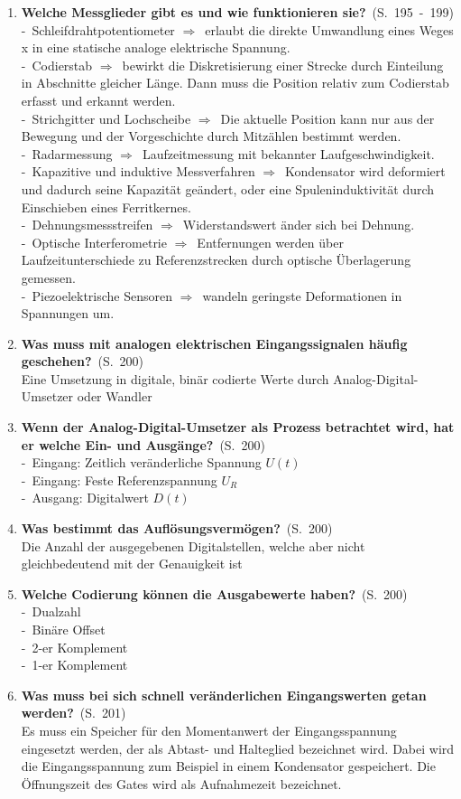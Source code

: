 \documentclass[a4paper,12pt]{article}
\newcommand{\question}[3]{\pagebreak[3]\item {\textbf{#1?}}\ (S.\ #2)#3}
\newcommand{\catchword}[1]{\\-\ #1}
\newcommand{\normaltext}[1]{\\#1}
\newcommand{\resultol}[1]{$\Rightarrow$\ #1}
\newcommand{\page}[1]{#1}
\newcommand{\pages}[2]{#1\ -\ #2}
\begin{document}
\begin{enumerate}
  \question{Welche Messglieder gibt es und wie funktionieren sie}{\pages{195}{199}}
  {
    \catchword{Schleifdrahtpotentiometer \resultol{erlaubt die direkte Umwandlung eines Weges x in
               eine statische analoge elektrische Spannung.}}
    \catchword{Codierstab \resultol{bewirkt die Diskretisierung einer Strecke durch Einteilung in Abschnitte 
               gleicher Länge. Dann muss die Position relativ zum Codierstab erfasst und erkannt werden.}}
    \catchword{Strichgitter und Lochscheibe \resultol{Die aktuelle Position kann nur aus der Bewegung und der 
               Vorgeschichte durch Mitzählen bestimmt werden.}}
    \catchword{Radarmessung \resultol{Laufzeitmessung mit bekannter Laufgeschwindigkeit.}}
    \catchword{Kapazitive und induktive Messverfahren \resultol{Kondensator wird deformiert und dadurch seine
               Kapazität geändert, oder eine Spuleninduktivität durch Einschieben eines Ferritkernes.}}
    \catchword{Dehnungsmessstreifen \resultol{Widerstandswert änder sich bei Dehnung.}}
    \catchword{Optische Interferometrie \resultol{Entfernungen werden über Laufzeitunterschiede
               zu Referenzstrecken durch optische Überlagerung gemessen.}}
    \catchword{Piezoelektrische Sensoren \resultol{wandeln geringste Deformationen in Spannungen um.}}
  }

  \question{Was muss mit analogen elektrischen Eingangssignalen häufig geschehen}{\page{200}}
  {
    \normaltext{Eine Umsetzung in digitale, binär codierte Werte durch Analog-Digital-Umsetzer
                oder Wandler}
  }

  \question{Wenn der Analog-Digital-Umsetzer als Prozess betrachtet wird, hat er welche Ein-
            und Ausgänge}{\page{200}}
  {
    \catchword{Eingang: Zeitlich veränderliche Spannung $U(t)$}
    \catchword{Eingang: Feste Referenzspannung $U_R$}
    \catchword{Ausgang: Digitalwert $D(t)$}
  }

  \question{Was bestimmt das Auflösungsvermögen}{\page{200}}
  {
    \normaltext{Die Anzahl der ausgegebenen Digitalstellen, welche aber nicht gleichbedeutend
                mit der Genauigkeit ist}
  }

  \question{Welche Codierung können die Ausgabewerte haben}{\page{200}}
  {
    \catchword{Dualzahl}
    \catchword{Binäre Offset}
    \catchword{2-er Komplement}
    \catchword{1-er Komplement}
  }

\question{Was muss bei sich schnell veränderlichen Eingangswerten getan werden}{\page{201}}
  {
    \normaltext{Es muss ein Speicher für den Momentanwert der Eingangsspannung eingesetzt werden,
                der als Abtast- und Halteglied bezeichnet wird. Dabei wird die Eingangsspannung
                zum Beispiel in einem Kondensator gespeichert. Die Öffnungszeit des Gates wird
                als Aufnahmezeit bezeichnet.}
  }


\end{enumerate}
\end{document}
